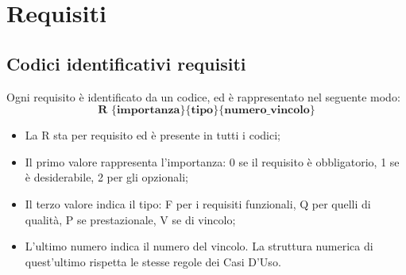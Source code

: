 \section{Requisiti}
\subsection{Codici identificativi requisiti}
Ogni requisito è identificato da un codice, ed è rappresentato nel seguente modo:
$$ \textbf{R \{importanza\}\{tipo\}\{numero\_vincolo\} } $$

\begin{itemize}
	\item La R sta per requisito ed è presente in tutti i codici;
	\item Il primo valore rappresenta l'importanza: 0 se il requisito è obbligatorio, 1 se è desiderabile, 2 per gli opzionali;
	\item Il terzo valore indica il tipo: F per i requisiti funzionali, Q per quelli di qualità, P se prestazionale, V se di vincolo;
	\item L'ultimo numero indica il numero del vincolo. La struttura numerica di quest'ultimo rispetta le stesse regole dei Casi D'Uso.
\end{itemize}
